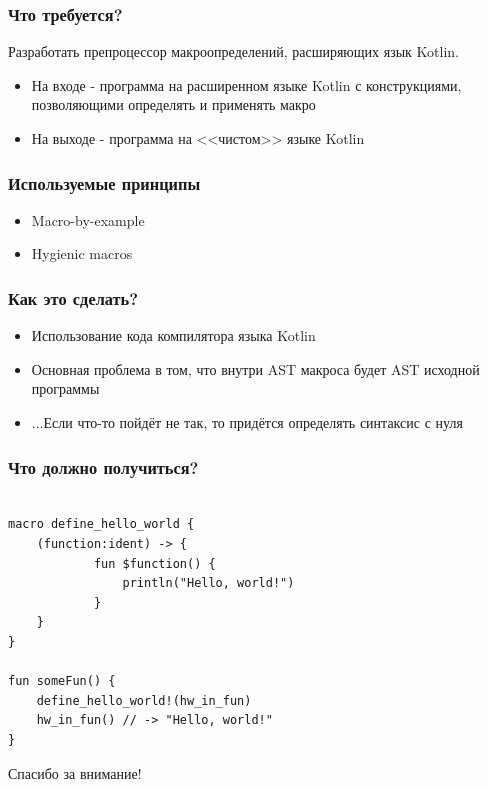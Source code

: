 \documentclass[11pt]{beamer}
\begin{document}
\begin{frame}
\frametitle{Что требуется?}

Разработать препроцессор макроопределений, расширяющих язык Kotlin.

\begin{itemize}
	\item На входе - программа на расширенном языке Kotlin с конструкциями, позволяющими определять и применять макро
	\item На выходе - программа на <<чистом>> языке Kotlin
\end{itemize}

\end{frame}


\begin{frame}
\frametitle{Используемые принципы}

\begin{itemize}
	\item Macro-by-example
	\item Hygienic macros
\end{itemize}

\end{frame}


\begin{frame}
\frametitle{Как это сделать?}

\begin{itemize}
	\item Использование кода компилятора языка Kotlin
	\item Основная проблема в том, что внутри AST макроса будет AST исходной программы
	\item ...Если что-то пойдёт не так, то придётся определять синтаксис с нуля
\end{itemize}

\end{frame}

\begin{frame}[fragile]
\frametitle{Что должно получиться?}

\begin{lstlisting}

macro define_hello_world {
    (function:ident) -> {
            fun $function() {
                println("Hello, world!")
            }
    }
}

fun someFun() {
    define_hello_world!(hw_in_fun)
    hw_in_fun() // -> "Hello, world!"
}

\end{lstlisting}

\end{frame}

\begin{frame}
\huge{\centerline{Спасибо за внимание!}}
\end{frame}
\end{document}
